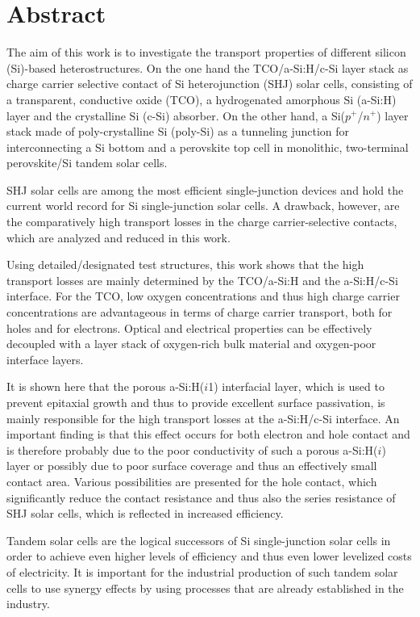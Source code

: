 \chapter*{Abstract}
\label{chap:Abstract}


The aim of this work is to investigate the transport properties of different silicon (Si)-based heterostructures. On the one hand the TCO/a-Si:H/c-Si layer stack as charge carrier selective contact of Si heterojunction (SHJ) solar cells, consisting of a transparent, conductive oxide (TCO), a hydrogenated amorphous Si (a-Si:H) layer and the crystalline Si (c-Si) absorber. On the other hand, a Si($p^+$/$n^+$) layer stack made of poly-crystalline Si (poly-Si) as a tunneling junction for interconnecting a Si bottom and a perovskite top cell in monolithic, two-terminal perovskite/Si tandem solar cells. 

SHJ solar cells are among the most efficient single-junction devices and hold the current world record for Si single-junction solar cells. A drawback, however, are the comparatively high transport losses in the charge carrier-selective contacts, which are analyzed and reduced in this work. 

Using detailed/designated test structures, this work shows that the high transport losses are mainly determined by the TCO/a-Si:H and the a-Si:H/c-Si interface. For the TCO, low oxygen concentrations and thus high charge carrier concentrations are advantageous in terms of charge carrier transport, both for holes and for electrons. Optical and electrical properties can be effectively decoupled with a layer stack of oxygen-rich bulk material and oxygen-poor interface layers. 

It is shown here that the porous a-Si:H($i$1) interfacial layer, which is used to prevent epitaxial growth and thus to provide excellent surface passivation, is mainly responsible for the high transport losses at the a-Si:H/c-Si interface. 
An important finding is that this effect occurs for both electron and hole contact and is therefore probably due to the poor conductivity of such a porous a-Si:H($i$) layer or possibly due to poor surface coverage and thus an effectively small contact area.
Various possibilities are presented for the hole contact, which significantly reduce the contact resistance and thus also the series resistance of SHJ solar cells, which is reflected in increased efficiency. 

Tandem solar cells are the logical successors of Si single-junction solar cells in order to achieve even higher levels of efficiency and thus even lower levelized costs of electricity.
It is important for the industrial production of such tandem solar cells to use synergy effects by using processes that are already established in the industry. 

